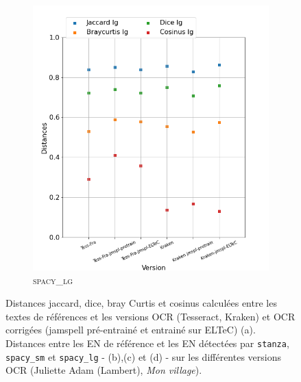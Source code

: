 \begin{figure}[H]
\begin{minipage}{6cm}
\begin{subfigure}{0.89\textwidth}
  \includegraphics[width=.89\textwidth]{IMAGES/ELTeC_DISTANCES_spaCy3.5.1/ADAM-graph-dist-spaCy3.5.1-lg.png}
   \caption{\textsc{spacy\_lg}}
  \label{fig: }
  \end{subfigure}
  \end{minipage}
\caption{Distances jaccard, dice, bray Curtis et cosinus calculées entre les textes de références et les versions OCR (Tesseract, Kraken) et OCR corrigées (jamspell pré-entrainé et entrainé sur ELTeC) (a). Distances entre les EN de référence et les EN détectées par \texttt{stanza}, \texttt{spacy\_sm} et \texttt{spacy\_lg} - (b),(c) et (d) - sur les différentes versions OCR (Juliette Adam (Lambert), \textit{Mon village}).}
\label{fig:}
\end{figure}


